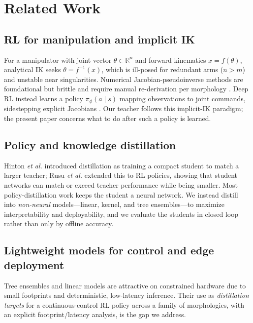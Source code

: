 \documentclass[conference]{IEEEtran}
\begin{document}
\section{Related Work}
\subsection{RL for manipulation and implicit IK}
For a manipulator with joint vector $\theta\in\mathbb{R}^n$ and forward
kinematics $x=f(\theta)$, analytical IK seeks $\theta=f^{-1}(x)$, which is
ill-posed for redundant arms ($n>m$) and unstable near singularities. Numerical
Jacobian-pseudoinverse methods are foundational but brittle and require manual
re-derivation per morphology \cite{kober}. Deep RL instead learns a policy
$\pi_\phi(a\mid s)$ mapping observations to joint commands, sidestepping explicit
Jacobians \cite{lobbezoo_survey, shahid, elguea}. Our teacher follows this
implicit-IK paradigm; the present paper concerns what to do after such a
policy is learned.

\subsection{Policy and knowledge distillation}
Hinton \emph{et al.} \cite{hinton} introduced distillation as training a compact
student to match a larger teacher; Rusu \emph{et al.} \cite{rusu} extended this
to RL policies, showing that student networks can match or exceed teacher
performance while being smaller. Most policy-distillation work keeps the student
a neural network. We instead distill into \emph{non-neural} models---linear,
kernel, and tree ensembles---to maximize interpretability and deployability, and
we evaluate the students in closed loop rather than only by offline accuracy.

\subsection{Lightweight models for control and edge deployment}
Tree ensembles \cite{breiman, xgboost} and linear models are attractive on
constrained hardware due to small footprints and deterministic, low-latency
inference. Their use as \emph{distillation targets} for a continuous-control RL
policy across a family of morphologies, with an explicit footprint/latency
analysis, is the gap we address.
\end{document}
